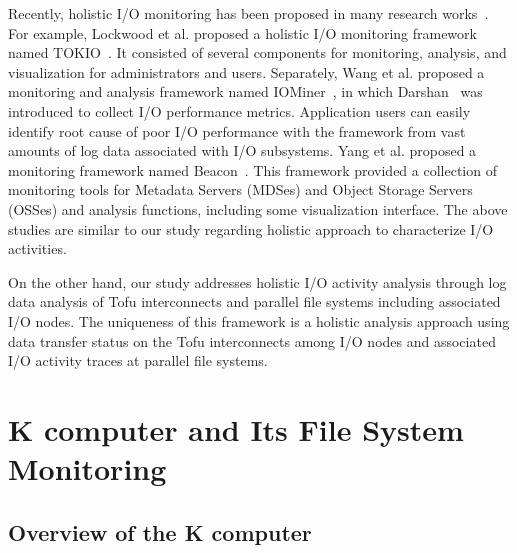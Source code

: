 \documentclass{jhps}
\begin{document}
Recently, holistic I/O monitoring has been proposed
in many research works~\cite{lockwood:cug18,wang:cluster18,yang:nsdi2019}.
For example, Lockwood et al. proposed a holistic I/O monitoring framework
named TOKIO~\cite{lockwood:cug18}.
It consisted of several components for monitoring, analysis, and visualization
for administrators and users.
Separately, Wang et al. proposed a monitoring and analysis framework
named IOMiner~\cite{wang:cluster18}, in which Darshan~\cite{darshan:web}
was introduced to collect I/O performance metrics.
Application users can easily identify root cause of
poor I/O performance with the framework from vast amounts of log data
associated with I/O subsystems.
Yang et al. proposed a monitoring framework named Beacon~\cite{yang:nsdi2019}.
This framework provided a collection of monitoring tools for Metadata Servers (MDSes)
and Object Storage Servers (OSSes) and analysis functions,
including some visualization interface.
The above studies are similar to our study regarding holistic approach
to characterize I/O activities.

On the other hand, our study addresses holistic I/O activity analysis
through log data analysis of Tofu interconnects and parallel file systems
including associated I/O nodes.
The uniqueness of this framework is a holistic analysis approach
using data transfer status on the Tofu interconnects among I/O nodes
and associated I/O activity traces at parallel file systems.

\section{K computer and Its File System Monitoring}\label{sec:K_OVERVIEW}
\label{sec:K_COMP}

\subsection{Overview of the K computer}
\label{ssec:K_COMP_OVERVIEW}
\end{document}
